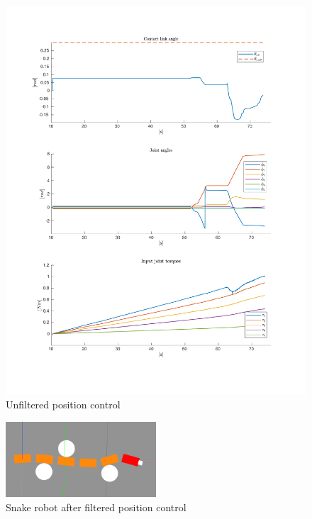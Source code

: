 \begin{figure}
    \centering
    
    \includegraphics[trim=2cm 2cm 2cm 2cm, clip=true, width=\textwidth]{figures/experiments/single_pos/single-pos-3plot-fail.pdf}

    \caption{Unfiltered position control}
    \label{fig:singlepos-nofilter}
\end{figure}

\begin{figure}
    \centering
    \includegraphics[width=0.5\textwidth]{figures/experiments/single_pos/gazebo_single_pos.png}
    \caption{Snake robot after filtered position control}
    \label{fig:singlepos-gazebo}
\end{figure}

